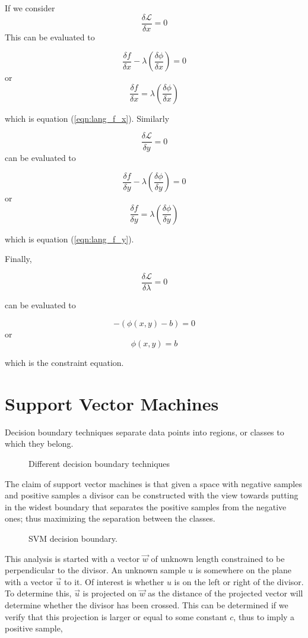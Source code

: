 \documentclass[]{article}
\begin{document}
If we consider
\[
\frac{\delta \mathcal{L}}{\delta x} = 0 
\]
 This can be evaluated to

\[
\frac{\delta f}{\delta x} -\lambda\left( \frac{\delta \phi}{\delta x}  \right)   = 0 
\]
or
\[
\frac{\delta f}{\delta x}  = \lambda\left( \frac{\delta \phi}{\delta x}  \right)
\]

which is equation (\ref{eqn:lang_f_x}). Similarly

\[
\frac{\delta \mathcal{L}}{\delta y} = 0 
\]
 can be evaluated to

\[
\frac{\delta f}{\delta y} -\lambda\left( \frac{\delta \phi}{\delta y}  \right)   = 0 
\]
or
\[
\frac{\delta f}{\delta y}  = \lambda\left( \frac{\delta \phi}{\delta y}  \right)
\]

which is equation (\ref{eqn:lang_f_y}).

Finally, 

\[
\frac{\delta \mathcal{L}}{\delta \lambda} = 0 
\]

 can be evaluated to

\[
-\left( \phi(x,y) - b\right)   = 0 
\]
or
\[
\phi(x,y) = b 
\]

which is the constraint equation.


\section{Support Vector Machines}
\label{sec:svm}

Decision boundary techniques separate data points into regions, or classes to which they belong.




\begin{figure}[h]
	\centering
	
	\caption{Different decision boundary techniques}
	\label{fig:fig4}
\end{figure}


The claim of support vector machines is that given a space with negative samples and positive samples a divisor can be constructed with the view towards putting in the widest boundary that separates the positive samples from the negative ones; thus maximizing the separation between the classes.

\begin{figure}[h]
	\centering
	
	\caption{SVM decision boundary.}
	\label{fig:fig5}
\end{figure}

This analysis is started with a vector $\vec{w}$ of unknown length constrained to be perpendicular to the divisor. An unknown sample $u$ is somewhere on the plane with a vector $\vec{u}$ to it. Of interest is whether $u$ is on the left or right of the divisor. To determine this, $\vec{u}$ is projected on $\vec{w}$ as the distance of the projected vector will determine whether the divisor has been crossed. This can be determined if we verify that this projection is larger or equal to some constant $c$, thus to imply a positive sample,
\end{document}
